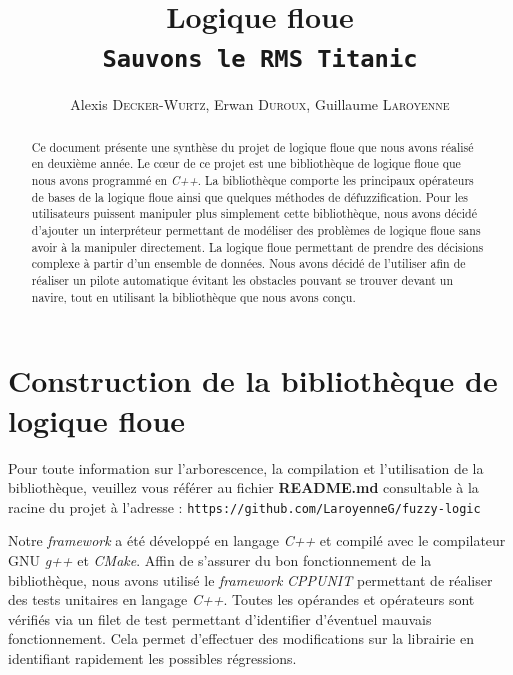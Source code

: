 \documentclass[a4paper,11pt]{article}
\title{Logique floue\\\texttt{Sauvons le RMS Titanic}}
\author{Alexis \textsc{Decker-Wurtz}, Erwan  \textsc{Duroux}, Guillaume  \textsc{Laroyenne}}
\begin{document}
    \maketitle

    \begin{abstract}
        Ce document présente une synthèse du projet de logique floue que nous avons réalisé en deuxième année.
        Le cœur de ce projet est une bibliothèque de logique floue que nous avons programmé en \textit{C++}. La bibliothèque comporte les principaux opérateurs de bases de la logique floue ainsi que quelques méthodes de défuzzification.
        Pour les utilisateurs puissent manipuler plus simplement cette bibliothèque, nous avons décidé d'ajouter un interpréteur permettant de modéliser des problèmes de logique floue sans avoir à la manipuler directement.
        La logique floue permettant de prendre des décisions complexe à partir d'un ensemble de données. Nous avons décidé de l'utiliser afin de réaliser un pilote automatique évitant les obstacles pouvant se trouver devant un navire, tout en utilisant la bibliothèque que nous avons conçu.
    \end{abstract}

    \section{Construction de la bibliothèque de logique floue}

    \begin{center}
        Pour toute information sur l'arborescence, la compilation et l'utilisation de la bibliothèque, veuillez vous référer au fichier \textbf{README.md} consultable à la racine du projet à l’adresse : \texttt{https://github.com/LaroyenneG/fuzzy-logic}
    \end{center}

    Notre \textit{framework} a été développé en langage \textit{C++} et compilé avec le compilateur GNU \textit{g++} et \textit{CMake}.
    Affin de s’assurer du bon fonctionnement de la bibliothèque, nous avons utilisé le \textit{framework} \textit{CPPUNIT} permettant de réaliser des tests unitaires en langage \textit{C++}.
    Toutes les opérandes et opérateurs sont vérifiés via un filet de test permettant d’identifier d’éventuel mauvais fonctionnement.
    Cela permet d'effectuer des modifications sur la librairie en identifiant rapidement les possibles régressions.
\end{document}
